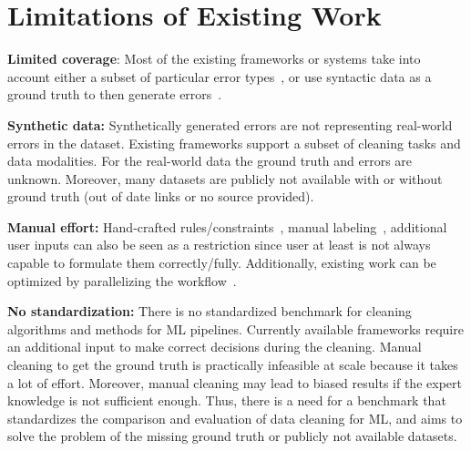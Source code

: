 \newpage

\section{Limitations of Existing Work}
\label{sec:limitations_of_existing_work}

\textbf{Limited coverage}: Most of the existing frameworks or systems take into account either a subset of particular error types~\cite{boostclean, raha, baran, jenga}, or use syntactic data as a ground truth to then generate errors~\cite{RestatGCS2022, bart}.

\textbf{Synthetic data:} 
Synthetically generated errors are not representing real-world errors in the dataset. Existing frameworks support a subset of cleaning tasks and data modalities.
For the real-world data the ground truth and errors are unknown. Moreover, many datasets are publicly not available with or without ground truth (out of date links or no source provided).

\textbf{Manual effort:} 
Hand-crafted rules/constraints~\cite{bart, RestatGCS2022}, manual labeling~\cite{raha, baran}, additional user inputs can also be seen as a restriction 
since user at least is not always capable to formulate them correctly/fully. %
Additionally, existing work can be optimized by parallelizing the workflow~\cite{raha, baran, RekatsinasCIR2017, HeidariMIR2019, RestatGCS2022, jenga}.

\textbf{No standardization:} 
There is no standardized benchmark for cleaning algorithms and methods for ML pipelines. 
Currently available frameworks require an additional input to make correct decisions during the cleaning. 
Manual cleaning to get the ground truth is practically infeasible at scale because it takes a lot of effort.
Moreover, manual cleaning may lead to biased results if the expert knowledge is not sufficient enough.
Thus, there is a need for a benchmark that standardizes the comparison and evaluation of data cleaning for ML, and aims to solve the problem of the missing ground truth or publicly not available datasets.
